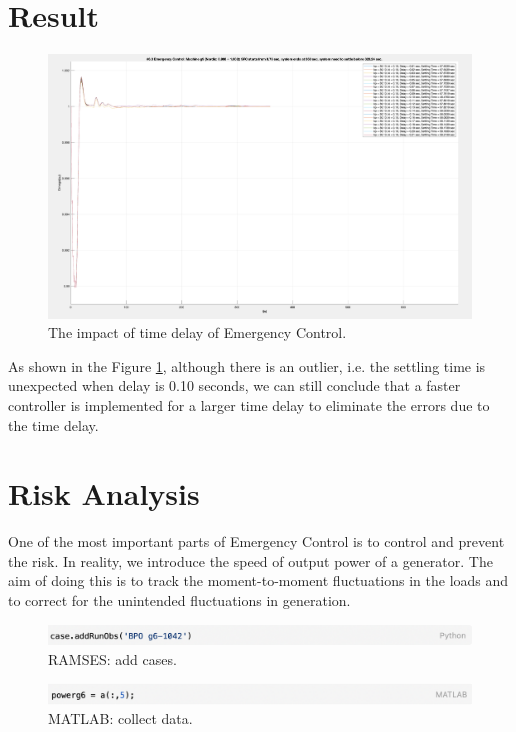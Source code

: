 \documentclass{report}
\begin{document}
\section{Result} %
\begin{figure}[htbp]
\centering
\includegraphics[width = .819\textwidth]{figure/6_3.png}
\caption{The impact of time delay of Emergency Control.}
\label{6_3}
\end{figure}

As shown in the Figure \textcolor{red}{\ref{6_3}}, although there is an outlier, i.e. the settling time is unexpected when delay is 0.10 seconds, we can still conclude that a faster controller is implemented for a larger time delay to eliminate the errors due to the time delay.\\

\section{Risk Analysis}
One of the most important parts of Emergency Control is to control and prevent the risk.  In reality, we introduce the speed of output power of a generator. The aim of doing this is to track the moment-to-moment fluctuations in the loads and to correct for the unintended fluctuations in generation.\\


\begin{figure}[htbp]
\centering
\includegraphics[width = .819\textwidth]{figure/6_5_code1.png}
\caption{RAMSES: add cases.}
\label{6_5_code1}
\end{figure}


\begin{figure}[htbp]
\centering
\includegraphics[width = .819\textwidth]{figure/6_5_code2.png}
\caption{MATLAB: collect data.}
\label{6_5_code2}
\end{figure}
\end{document}
